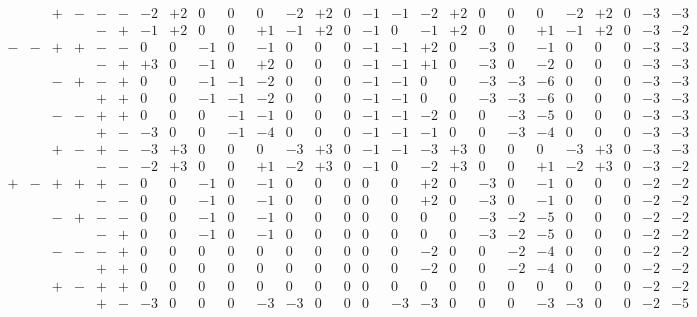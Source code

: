 \[\begin{array}{cccccc|rrrrr|rrrrr|rrrrr|rrrrr}
&&+&-&-&-&-2&+2&0&0&0&-2&+2&0&-1&-1&-2&+2&0&0&0&-2&+2&0&-3&-3\\
&&&&-&+&-1&+2&0&0&+1&-1&+2&0&-1&0&-1&+2&0&0&+1&-1&+2&0&-3&-2\\[4pt]
-&-&+&+&-&-&0&0&-1&0&-1&0&0&0&-1&-1&+2&0&-3&0&-1&0&0&0&-3&-3\\
&&&&-&+&+3&0&-1&0&+2&0&0&0&-1&-1&+1&0&-3&0&-2&0&0&0&-3&-3\\
&&-&+&-&+&0&0&-1&-1&-2&0&0&0&-1&-1&0&0&-3&-3&-6&0&0&0&-3&-3\\
&&&&+&+&0&0&-1&-1&-2&0&0&0&-1&-1&0&0&-3&-3&-6&0&0&0&-3&-3\\
&&-&-&+&+&0&0&0&-1&-1&0&0&0&-1&-1&-2&0&0&-3&-5&0&0&0&-3&-3\\
&&&&+&-&-3&0&0&-1&-4&0&0&0&-1&-1&-1&0&0&-3&-4&0&0&0&-3&-3\\
&&+&-&+&-&-3&+3&0&0&0&-3&+3&0&-1&-1&-3&+3&0&0&0&-3&+3&0&-3&-3\\
&&&&-&-&-2&+3&0&0&+1&-2&+3&0&-1&0&-2&+3&0&0&+1&-2&+3&0&-3&-2\\[4pt]
+&-&+&+&+&-&0&0&-1&0&-1&0&0&0&0&0&+2&0&-3&0&-1&0&0&0&-2&-2\\
&&&&-&-&0&0&-1&0&-1&0&0&0&0&0&+2&0&-3&0&-1&0&0&0&-2&-2\\
&&-&+&-&-&0&0&-1&0&-1&0&0&0&0&0&0&0&-3&-2&-5&0&0&0&-2&-2\\
&&&&-&+&0&0&-1&0&-1&0&0&0&0&0&0&0&-3&-2&-5&0&0&0&-2&-2\\
&&-&-&-&+&0&0&0&0&0&0&0&0&0&0&-2&0&0&-2&-4&0&0&0&-2&-2\\
&&&&+&+&0&0&0&0&0&0&0&0&0&0&-2&0&0&-2&-4&0&0&0&-2&-2\\
&&+&-&+&+&0&0&0&0&0&0&0&0&0&0&0&0&0&0&0&0&0&0&-2&-2\\
&&&&+&-&-3&0&0&0&-3&-3&0&0&0&-3&-3&0&0&0&-3&-3&0&0&-2&-5\\
\end{array}
\]
\endgroup

